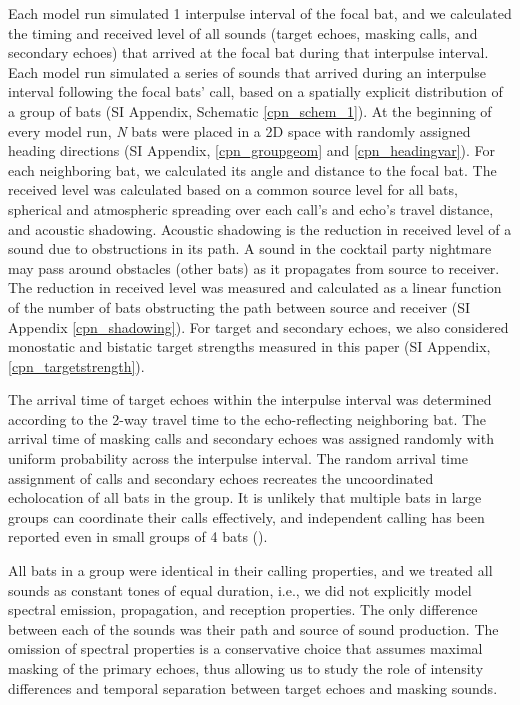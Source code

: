\documentclass[
]{book}
\begin{document}
Each model run simulated 1 interpulse interval of the focal bat, and we calculated the timing and received level of all sounds (target echoes, masking calls, and secondary echoes) that arrived at the focal bat during that interpulse interval. Each model run simulated a series of sounds that arrived during an interpulse interval following the focal bats' call, based on a spatially explicit distribution of a group of bats (SI Appendix, Schematic \ref{cpn_schem_1}). At the beginning of every model run, \emph{N} bats were placed in a 2D space with randomly assigned heading directions (SI Appendix, \ref{cpn_groupgeom} and \ref{cpn_headingvar}). For each neighboring bat, we calculated its angle and distance to the focal bat. The received level was calculated based on a common source level for all bats, spherical and atmospheric spreading over each call's and echo's travel distance, and acoustic shadowing. Acoustic shadowing is the reduction in received level of a sound due to obstructions in its path. A sound in the cocktail party nightmare may pass around obstacles (other bats) as it propagates from source to receiver. The reduction in received level was measured and calculated as a linear function of the number of bats obstructing the path between source and receiver (SI Appendix \ref{cpn_shadowing}). For target and secondary echoes, we also considered monostatic and bistatic target strengths measured in this paper (SI Appendix, \ref{cpn_targetstrength}).

The arrival time of target echoes within the interpulse interval was determined according to the 2-way travel time to the echo-reflecting neighboring bat. The arrival time of masking calls and secondary echoes was assigned randomly with uniform probability across the interpulse interval. The random arrival time assignment of calls and secondary echoes recreates the uncoordinated echolocation of all bats in the group. It is unlikely that multiple bats in large groups can coordinate their calls effectively, and independent calling has been reported even in small groups of 4 bats (\citet{hase2018a}).

All bats in a group were identical in their calling properties, and we treated all sounds as constant tones of equal duration, i.e., we did not explicitly model spectral emission, propagation, and reception properties. The only difference between each of the sounds was their path and source of sound production. The omission of spectral properties is a conservative choice that assumes maximal masking of the primary echoes, thus allowing us to study the role of intensity differences and temporal separation between target echoes and masking sounds.
\end{document}

